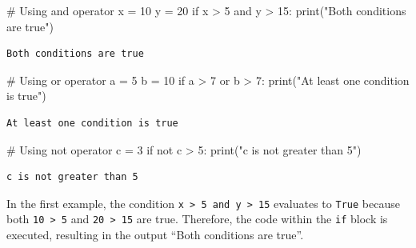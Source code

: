 \documentclass[
  letterpaper,
  DIV=11,
  numbers=noendperiod]{scrreprt}
\newenvironment{Shaded}{\begin{snugshade}}{\end{snugshade}}
\newcommand{\BuiltInTok}[1]{\textcolor[rgb]{0.00,0.23,0.31}{#1}}
\newcommand{\CommentTok}[1]{\textcolor[rgb]{0.37,0.37,0.37}{#1}}
\newcommand{\ControlFlowTok}[1]{\textcolor[rgb]{0.00,0.23,0.31}{#1}}
\newcommand{\DecValTok}[1]{\textcolor[rgb]{0.68,0.00,0.00}{#1}}
\newcommand{\KeywordTok}[1]{\textcolor[rgb]{0.00,0.23,0.31}{#1}}
\newcommand{\NormalTok}[1]{\textcolor[rgb]{0.00,0.23,0.31}{#1}}
\newcommand{\OperatorTok}[1]{\textcolor[rgb]{0.37,0.37,0.37}{#1}}
\newcommand{\StringTok}[1]{\textcolor[rgb]{0.13,0.47,0.30}{#1}}
\begin{document}
\begin{Shaded}
\begin{Highlighting}[]
\CommentTok{\# Using \textquotesingle{}and\textquotesingle{} operator}
\NormalTok{x }\OperatorTok{=} \DecValTok{10}
\NormalTok{y }\OperatorTok{=} \DecValTok{20}
\ControlFlowTok{if}\NormalTok{ x }\OperatorTok{\textgreater{}} \DecValTok{5} \KeywordTok{and}\NormalTok{ y }\OperatorTok{\textgreater{}} \DecValTok{15}\NormalTok{:}
    \BuiltInTok{print}\NormalTok{(}\StringTok{"Both conditions are true"}\NormalTok{)}
\end{Highlighting}
\end{Shaded}

\begin{verbatim}
Both conditions are true
\end{verbatim}

\begin{Shaded}
\begin{Highlighting}[]
\CommentTok{\# Using \textquotesingle{}or\textquotesingle{} operator}
\NormalTok{a }\OperatorTok{=} \DecValTok{5}
\NormalTok{b }\OperatorTok{=} \DecValTok{10}
\ControlFlowTok{if}\NormalTok{ a }\OperatorTok{\textgreater{}} \DecValTok{7} \KeywordTok{or}\NormalTok{ b }\OperatorTok{\textgreater{}} \DecValTok{7}\NormalTok{:}
    \BuiltInTok{print}\NormalTok{(}\StringTok{"At least one condition is true"}\NormalTok{)}
\end{Highlighting}
\end{Shaded}

\begin{verbatim}
At least one condition is true
\end{verbatim}

\begin{Shaded}
\begin{Highlighting}[]
\CommentTok{\# Using \textquotesingle{}not\textquotesingle{} operator}
\NormalTok{c }\OperatorTok{=} \DecValTok{3}
\ControlFlowTok{if} \KeywordTok{not}\NormalTok{ c }\OperatorTok{\textgreater{}} \DecValTok{5}\NormalTok{:}
    \BuiltInTok{print}\NormalTok{(}\StringTok{"c is not greater than 5"}\NormalTok{)}
\end{Highlighting}
\end{Shaded}

\begin{verbatim}
c is not greater than 5
\end{verbatim}

In the first example, the condition
\texttt{x\ \textgreater{}\ 5\ and\ y\ \textgreater{}\ 15} evaluates to
\texttt{True} because both \texttt{10\ \textgreater{}\ 5} and
\texttt{20\ \textgreater{}\ 15} are true. Therefore, the code within the
\texttt{if} block is executed, resulting in the output ``Both conditions
are true''.
\end{document}
